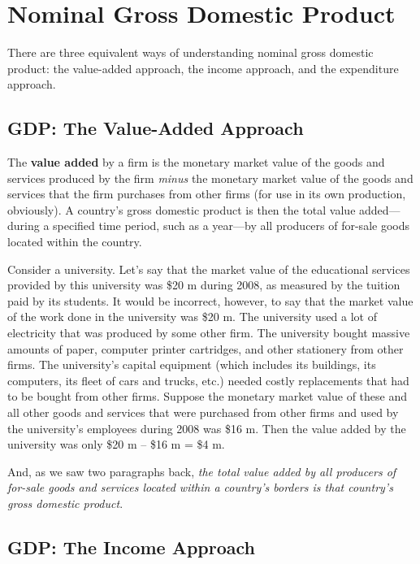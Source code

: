 \documentclass[
  letterpaper,
]{book}
\theoremstyle{plain}
\theoremstyle{remark}
\begin{document}
\section{Nominal Gross Domestic Product}\label{sec-nGDP}


There are three equivalent ways of understanding nominal gross domestic
product: the value-added approach, the income approach, and the
expenditure approach.

\subsection{GDP: The Value-Added Approach}\label{sec-gdp-value-added}

The \textbf{value added} by a firm is the monetary
market value of the goods and services produced by the firm \emph{minus}
the monetary market value of the goods and services that the firm
purchases from other firms (for use in its own production, obviously). A
country's gross domestic product is then the total value added---during
a specified time period, such as a year---by all producers of for-sale
goods located within the country.

Consider a university. Let's say that the market value of the
educational services provided by this university was \$20 m during 2008,
as measured by the tuition paid by its students. It would be incorrect,
however, to say that the market value of the work done in the university
was \$20 m. The university used a lot of electricity that was produced
by some other firm. The university bought massive amounts of paper,
computer printer cartridges, and other stationery from other firms. The
university's capital equipment (which includes its buildings, its
computers, its fleet of cars and trucks, etc.) needed costly
replacements that had to be bought from other firms. Suppose the
monetary market value of these and all other goods and services that
were purchased from other firms and used by the university's employees
during 2008 was \$16 m. Then the value added by the university was only
\$20 m -- \$16 m = \$4 m.

And, as we saw two paragraphs back, \emph{the total value added by all
producers of for-sale goods and services located within a country's
borders is that country's gross domestic product}.

\subsection{GDP: The Income Approach}\label{sec-gdp-income}
\end{document}
